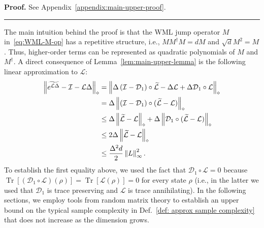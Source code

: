\documentclass[superscriptaddress,amsmath,amssymb,aps,pra,letterpaper,tightenlines,notitlepages,12pt]{revtex4-2}
\newenvironment{proof}[1][Proof]{\noindent\textbf{#1.} }{\ \rule{0.5em}{0.5em}}
\begin{document}
\begin{proof}
    See Appendix~\ref{appendix:main-upper-proof}.
\end{proof}

\medskip

The main intuition behind the proof is that the WML jump operator $M$ in~\eqref{eq:WML-M-op} has a repetitive structure, i.e., $MM^\dagger M = dM$ and $\sqrt{d}M^2=M$. Thus, higher-order terms can be represented as quadratic polynomials of $M$ and $M^\dagger$. A direct consequence of Lemma~\ref{lem:main-upper-lemma} is the following linear approximation to $\mathcal{L}$:
\begin{align}
    \left\Vert \widetilde{e^{\mathcal{L}\Delta}} - \mathcal{I} - \mathcal{L}\Delta\right\Vert_\diamond &=\left\Vert
    \Delta\left(\mathcal{I}-\mathcal{D}_1\right)\circ\widetilde{\mathcal{L}} - \Delta 
     \mathcal{L}  + \Delta \mathcal{D}_1 \circ \mathcal{L} \right\Vert_\diamond \notag \\
    &=\Delta\left\Vert(\mathcal{I} - \mathcal{D}_1)\circ (\widetilde{\mathcal{L}} - \mathcal{L})\right\Vert_\diamond \notag \\
    &\leq\Delta\left\Vert\widetilde{\mathcal{L}} - \mathcal{L}\right\Vert_\diamond + \Delta\left\Vert\mathcal{D}_1\circ (\widetilde{\mathcal{L}} - \mathcal{L})\right\Vert_\diamond \notag \\
    &\leq 2\Delta\left\Vert\widetilde{\mathcal{L}} - \mathcal{L}\right\Vert_\diamond \notag \\
    &\leq \frac{\Delta^2d}{2}\left\Vert L\right\Vert_\infty^2.
\end{align}
To establish the first equality above, we used the fact that $\mathcal{D}_1 \circ \mathcal{L}=0$ because $\operatorname{Tr}[(\mathcal{D}_1 \circ \mathcal{L})(\rho)] = \operatorname{Tr}[\mathcal{L}(\rho)]=0$ for every state $\rho$ (i.e., in the latter we used that $\mathcal{D}_1$ is trace preserving and $\mathcal{L}$ is trace annihilating). In the following sections, we employ tools from random matrix theory to establish an upper bound on the typical sample complexity in Def.~\ref{def: approx sample complexity} that does not increase as the dimension grows.
\end{document}
